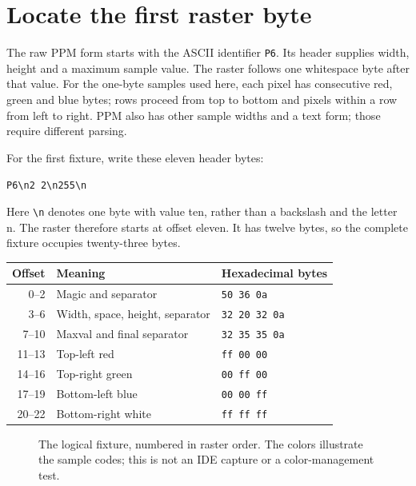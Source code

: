 \section{Locate the first raster byte}
The raw PPM form starts with the ASCII identifier \texttt{P6}. Its header supplies
width, height and a maximum sample value. The raster follows one whitespace byte after
that value. For the one-byte samples used here, each pixel has consecutive red, green
and blue bytes; rows proceed from top to bottom and pixels within a row from left to
right. PPM also has other sample widths and a text form; those require different parsing.

For the first fixture, write these eleven header bytes:
\begin{center}
\texttt{P6\textbackslash n2 2\textbackslash n255\textbackslash n}
\end{center}
Here \texttt{\textbackslash n} denotes one byte with value ten, rather than a backslash
and the letter n. The raster therefore starts at offset eleven. It has twelve bytes,
so the complete fixture occupies twenty-three bytes.
\begin{center}
\begin{tabular}{rll}
Offset & Meaning & Hexadecimal bytes \\
\hline
0--2 & Magic and separator & \texttt{50 36 0a} \\
3--6 & Width, space, height, separator & \texttt{32 20 32 0a} \\
7--10 & Maxval and final separator & \texttt{32 35 35 0a} \\
11--13 & Top-left red & \texttt{ff 00 00} \\
14--16 & Top-right green & \texttt{00 ff 00} \\
17--19 & Bottom-left blue & \texttt{00 00 ff} \\
20--22 & Bottom-right white & \texttt{ff ff ff} \\
\end{tabular}
\end{center}

\begin{figure}[htbp]
\centering
{}
\caption{The logical fixture, numbered in raster order. The colors illustrate the sample codes; this is not an IDE capture or a color-management test.}\label{ppm-logical-fixture}
\end{figure}

